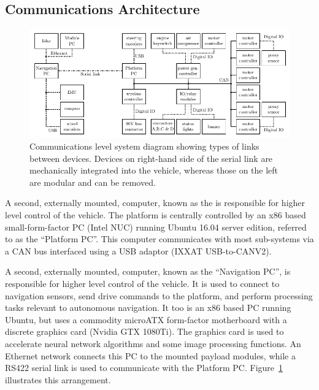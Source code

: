 \documentclass[preprint,authoryear,12pt]{elsarticle}
\begin{document}
    \subsection{Communications Architecture}
    \label{sect:architecture}

        \begin{figure}[htb]
            \centering
            \includegraphics[width=\linewidth]{imgs/system_diagram/diagram_v5.pdf}
            \caption{
                Communications level system diagram showing types of links between devices.
                Devices on right-hand side of the serial link are mechanically integrated into the vehicle, whereas those on the left are modular and can be removed.
            }
            \label{fig:system_diagram}
        \end{figure}

        A second, externally mounted, computer, known as the is responsible for higher level control of the vehicle.
        The platform is centrally controlled by an x86 based small-form-factor PC (Intel NUC) running Ubuntu 16.04 server edition, referred to as the ``Platform PC''.
        This computer communicates with most sub-systems via a CAN bus interfaced using a USB adaptor (IXXAT USB-to-CANV2).

        A second, externally mounted, computer, known as the ``Navigation PC'', is responsible for higher level control of the vehicle.
        It is used to connect to navigation sensors, send drive commands to the platform, and perform processing tasks relevant to autonomous navigation.
        It too is an x86 based PC running Ubuntu, but uses a commodity microATX form-factor motherboard with a discrete graphics card (Nvidia GTX 1080Ti).
        The graphics card is used to accelerate neural network algorithms and some image processing functions.
        An Ethernet network connects this PC to the mounted payload modules, while a RS422 serial link is used to communicate with the Platform PC.
        Figure~\ref{fig:system_diagram} illustrates this arrangement.
\end{document}
